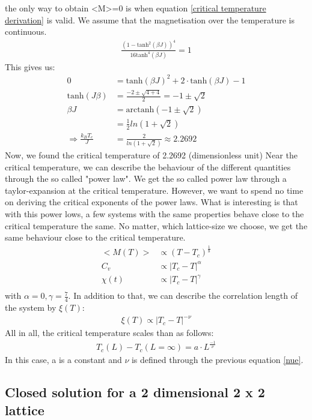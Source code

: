 \documentclass[10pt,a4paper]{article}
\begin{document}
the only way to obtain <M>=0 is when equation \ref{critical temperature derivation} is valid. We assume that the magnetisation over the temperature is continuous. 
\begin{align}
\frac{(1 - \mathrm{tanh}^2(\beta J))^{4}}{16\mathrm{tanh}^{4}(\beta J)} = 1 \label{critical temperature derivation}
\end{align}
This gives us:
\begin{align}
0&=\mathrm{tanh}(\beta J )^2+2 \cdot \mathrm{tanh}(\beta J ) -1 \\
\mathrm{tanh}(J \beta ) &= \frac{-2 \pm \sqrt{4+4}}{2} = -1 \pm \sqrt{2}\\
\beta J &= \mathrm{arctanh}(-1 \pm \sqrt{2})\\
&= \frac{1}{2} ln(1+\sqrt{2})\\
\Rightarrow \frac {k_B T_c}{J} &= \frac{2}{ln(1+\sqrt{2})}\approx 2.2692
\end{align}
Now, we found the critical temperature of 2.2692 (dimensionless unit)
Near the critical temperature, we can describe the behaviour of the different quantities through the so called "power law". We get the so called power law through   a taylor-expansion at the critical temperature.  However, we want to spend no time on deriving the critical exponents of the power laws. What is interesting is that with this power lows, a few systems with the same properties behave close to the critical temperature the same. No matter, which lattice-size we choose, we get the same behaviour close to the critical temperature. 
\begin{align}
<M(T)> & \propto (T-T_c)^{\frac{1}{8}}\\
C_v & \propto \left| T_c - T \right|^{\alpha}\\
\chi ( t)& \propto \left| T_c - T \right|^{\gamma}\\
\end{align}
with $\alpha=0, \gamma=\frac{7}{4} $. In addition to that, we can describe the correlation length of the system by $\xi(T) $:
\begin{align}
\xi (T) \propto \left| T_c - T \right|^{-\nu} \label{nue}
\end{align}
All in all, the critical temperature scales than as follows:
\begin{align}
T_c(L)-T_c(L=\infty)= a \cdot L^{\frac{-1}{\nu}}
\end{align}
In this case, a is a constant and $\nu$ is defined through the previous equation \ref{nue}. 
\subsection{Closed solution for a 2 dimensional 2 x 2 lattice \label{closed_solution}}
\end{document}
